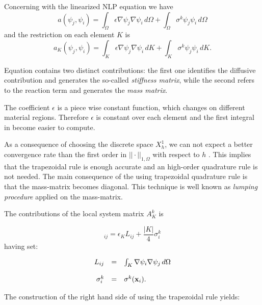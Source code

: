 Concerning with the linearized NLP equation we have
\begin{equation}
a(\psi_j,\psi_i)  = \int_{\Omega} \epsilon \nabla \psi_j \nabla \psi_i \, d\Omega + \int_{\Omega} \sigma^{k}\psi_j \psi_i \, d\Omega 
\end{equation}
and the restriction on each element $K$ is
\begin{equation}
\label{eq: bilinear local discrete}
a_K(\psi_j,\psi_i)  = \int_{K} \epsilon \nabla \psi_j \nabla \psi_i \, dK + \int_{K} \sigma^{k}\psi_j \psi_i \, dK .
\end{equation}

Equation  contains two distinct contributions: the first one identifies the diffusive contribution and generates the so-called \textit{stiffness matrix}, while the second refers to the reaction term and generates the \textit{mass matrix}.

The coefficient $\epsilon$ is a piece wise constant function, which changes on different material regions. Therefore $\epsilon$ is constant over each element and the first integral in  become easier to compute.

As a consequence of choosing the discrete space $X^1_{h}$,  we can not expect a better convergence rate than the first order in $||\cdot||_{1,\Omega}$ with respect to $h$ \cite{quarteroni:NumApprox}. This implies that the trapezoidal rule is enough accurate and an high-order quadrature rule is not needed. 
The main consequence of the using trapezoidal quadrature rule is that the mass-matrix becomes diagonal.
This technique is well known as \textit{lumping procedure} applied on the mass-matrix.

The contributions of the local system matrix $A_K^k$ is

\begin{equation}
[A_K^k]_{ij}  = \epsilon_K
L_{ij}
+
\dfrac{|K|}{4} \sigma^k_i
\end{equation}
having set:

\begin{equation}
\begin{array}{rcl}
L_{ij} & = & \int_K \nabla \psi_i  \nabla \psi_j \, d\Omega \\ \\
\sigma^k_i & =  &\sigma^k(\mathbf{x}_i) .
\end{array}
\end{equation}

The construction of the right hand side of  using the trapezoidal rule yields:

